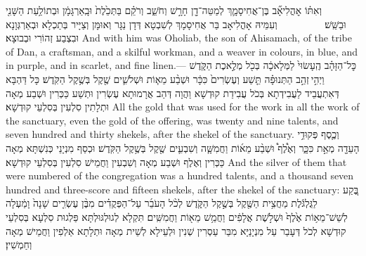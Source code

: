 {{וְאִתּ֗וֹ אׇהֳלִיאָ֞ב בֶּן־אֲחִיסָמָ֛ךְ לְמַטֵּה־דָ֖ן חָרָ֣שׁ וְחֹשֵׁ֑ב וְרֹקֵ֗ם בַּתְּכֵ֙לֶת֙ וּבָֽאַרְגָּמָ֔ן וּבְתוֹלַ֥עַת הַשָּׁנִ֖י וּבַשֵּֽׁשׁ׃ \setuma         }
{וְעִמֵּיהּ אָהֳלִיאָב בַּר אֲחִיסָמָךְ לְשִׁבְטָא דְּדָן נַגָּר וְאוּמָּן וְצַיָּיר בְּתַכְלָא וּבְאַרְגְּוָנָא וּבִצְבַע זְהוֹרִי וּבְבוּצָא׃}
{And with him was Oholiab, the son of Ahisamach, of the tribe of Dan, a craftsman, and a skilful workman, and a weaver in colours, in blue, and in purple, and in scarlet, and fine linen.—}{}
{כׇּל־הַזָּהָ֗ב הֶֽעָשׂוּי֙ לַמְּלָאכָ֔ה בְּכֹ֖ל מְלֶ֣אכֶת הַקֹּ֑דֶשׁ וַיְהִ֣י \legarmeh  זְהַ֣ב הַתְּנוּפָ֗ה תֵּ֤שַׁע וְעֶשְׂרִים֙ כִּכָּ֔ר וּשְׁבַ֨ע מֵא֧וֹת וּשְׁלֹשִׁ֛ים שֶׁ֖קֶל בְּשֶׁ֥קֶל הַקֹּֽדֶשׁ׃
}
{כָּל דַּהְבָּא דְּאִתְעֲבֵיד לַעֲבִידְתָא בְּכֹל עֲבִידַת קוּדְשָׁא וַהֲוָה דְּהַב אֲרָמוּתָא עֶשְׂרִין וּתְשַׁע כַּכְּרִין וּשְׁבַע מְאָה וּתְלָתִין סִלְעִין בְּסִלְעֵי קוּדְשָׁא׃}
{All the gold that was used for the work in all the work of the sanctuary, even the gold of the offering, was twenty and nine talents, and seven hundred and thirty shekels, after the shekel of the sanctuary.}{}
{וְכֶ֛סֶף פְּקוּדֵ֥י הָעֵדָ֖ה מְאַ֣ת כִּכָּ֑ר וְאֶ֩לֶף֩ וּשְׁבַ֨ע מֵא֜וֹת וַחֲמִשָּׁ֧ה וְשִׁבְעִ֛ים שֶׁ֖קֶל בְּשֶׁ֥קֶל הַקֹּֽדֶשׁ׃}
{וּכְסַף מִנְיָנֵי כְּנִשְׁתָּא מְאָה כַּכְּרִין וְאֶלֶף וּשְׁבַע מְאָה וְשִׁבְעִין וַחֲמֵישׁ סִלְעִין בְּסִלְעֵי קוּדְשָׁא׃}
{And the silver of them that were numbered of the congregation was a hundred talents, and a thousand seven hundred and three-score and fifteen shekels, after the shekel of the sanctuary:}{}
{בֶּ֚קַע לַגֻּלְגֹּ֔לֶת מַחֲצִ֥ית הַשֶּׁ֖קֶל בְּשֶׁ֣קֶל הַקֹּ֑דֶשׁ לְכֹ֨ל הָעֹבֵ֜ר עַל־הַפְּקֻדִ֗ים מִבֶּ֨ן עֶשְׂרִ֤ים שָׁנָה֙ וָמַ֔עְלָה לְשֵׁשׁ־מֵא֥וֹת אֶ֙לֶף֙ וּשְׁלֹ֣שֶׁת אֲלָפִ֔ים וַחֲמֵ֥שׁ מֵא֖וֹת וַחֲמִשִּֽׁים׃
}
{תִּקְלָא לְגוּלְגּוּלְתָּא פַּלְגוּת סִלְעָא בְּסִלְעֵי קוּדְשָׁא לְכֹל דְּעָבַר עַל מִנְיָנַיָּא מִבַּר עַסְרִין שְׁנִין וּלְעֵילָא לְשֵׁית מְאָה וּתְלָתָא אַלְפִין וַחֲמֵישׁ מְאָה וְחַמְשִׁין׃}
}

